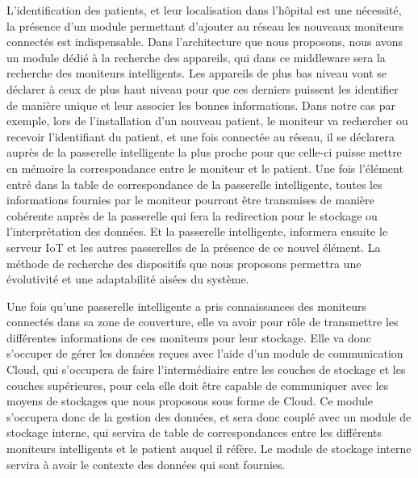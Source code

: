 L’identification des patients, et leur localisation dans l’hôpital est une nécessité, la présence d’un module permettant d’ajouter au réseau les nouveaux moniteurs connectés est indispensable. Dans l’architecture que nous proposons, nous avons un module dédié à la recherche des appareils, qui dans ce middleware sera la recherche des moniteurs intelligents. Les appareils de plus bas niveau vont se déclarer à ceux de plus haut niveau pour que ces derniers puissent les identifier de manière unique et leur associer les bonnes informations. Dans notre cas par exemple, lors de l’installation d’un nouveau patient, le moniteur va rechercher ou recevoir l’identifiant du patient, et une fois connectée au réseau, il se déclarera auprès de la passerelle intelligente la plus proche pour que celle-ci puisse mettre en mémoire la correspondance entre le moniteur et le patient. Une fois l’élément entré dans la table de correspondance de la passerelle intelligente, toutes les informations fournies par le moniteur pourront être transmises de manière cohérente auprès de la passerelle qui fera la redirection pour le stockage ou l’interprétation des données. Et la passerelle intelligente, informera ensuite le serveur IoT et les autres passerelles de la présence de ce nouvel élément. La méthode de recherche des dispositifs que nous proposons permettra une évolutivité et une adaptabilité aisées du système.

Une fois qu’une passerelle intelligente a pris connaissances des moniteurs connectés dans sa zone de couverture, elle va avoir pour rôle de transmettre les différentes informations de ces moniteurs pour leur stockage. Elle va donc s’occuper de gérer les données reçues avec l’aide d’un module de communication Cloud, qui s’occupera de faire l’intermédiaire entre les couches de stockage et les couches supérieures, pour cela elle doit être capable de communiquer avec les moyens de stockages que nous proposons sous forme de Cloud. Ce module s’occupera donc de la gestion des données, et sera donc couplé avec un module de stockage interne, qui servira de table de correspondances entre les différents moniteurs intelligents et le patient auquel il réfère. Le module de stockage interne servira à avoir le contexte des données qui sont fournies.

